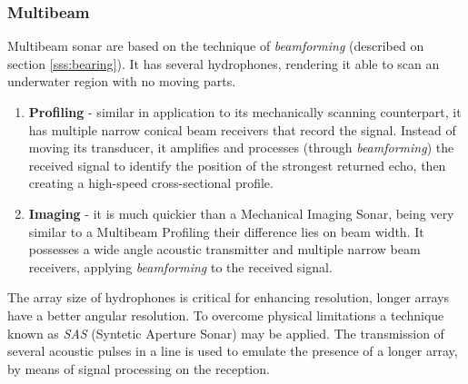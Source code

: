 
\subsubsection{Multibeam}

Multibeam sonar are based on the technique of \textit{beamforming} (described
on section \ref{sss:bearing}). It has several hydrophones, rendering it able to
scan an underwater region with no moving parts.


\begin{enumerate}
  \item \textbf{Profiling} - similar in application to its mechanically scanning
  counterpart, it has multiple narrow conical beam receivers that record the
  signal. Instead of moving its transducer, it amplifies and processes (through
  \textit{beamforming}) the received signal to identify the position of the
  strongest returned echo, then creating a high-speed cross-sectional profile.
  \item \textbf{Imaging} - it is much quickier than a Mechanical Imaging
  Sonar, being very similar to a Multibeam Profiling their difference lies on
  beam width.   It possesses a wide angle acoustic transmitter and multiple
  narrow beam receivers, applying \textit{beamforming} to the received signal.
\end{enumerate}

The array size of hydrophones is critical for enhancing resolution, longer
arrays have a better angular resolution. To overcome physical limitations a
technique known as \textit{SAS} (Syntetic Aperture Sonar) may be applied. The
transmission of several acoustic pulses in a line is used to emulate the
presence of a longer array, by means of signal processing on the reception.
